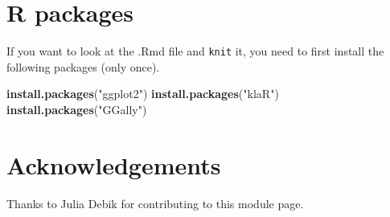 \documentclass[]{article}
\newenvironment{Shaded}{\begin{snugshade}}{\end{snugshade}}
\newcommand{\KeywordTok}[1]{\textcolor[rgb]{0.13,0.29,0.53}{\textbf{#1}}}
\newcommand{\NormalTok}[1]{#1}
\newcommand{\StringTok}[1]{\textcolor[rgb]{0.31,0.60,0.02}{#1}}
\begin{document}
\hypertarget{r-packages}{%
\section{R packages}\label{r-packages}}

If you want to look at the .Rmd file and \texttt{knit} it, you need to
first install the following packages (only once).

\begin{Shaded}
\begin{Highlighting}[]
\KeywordTok{install.packages}\NormalTok{(}\StringTok{"ggplot2"}\NormalTok{)}
\KeywordTok{install.packages}\NormalTok{(}\StringTok{"klaR"}\NormalTok{)}
\KeywordTok{install.packages}\NormalTok{(}\StringTok{"GGally"}\NormalTok{)}
\end{Highlighting}
\end{Shaded}

\hypertarget{acknowledgements}{%
\section{Acknowledgements}\label{acknowledgements}}

Thanks to Julia Debik for contributing to this module page.
\end{document}
